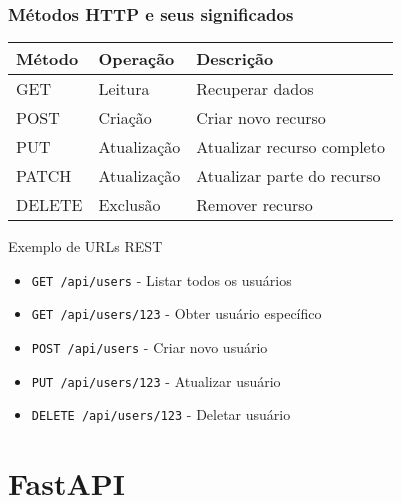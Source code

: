 \documentclass[aspectratio=169]{beamer}
\begin{document}
\begin{frame}
    \frametitle{Métodos HTTP e seus significados}
    \begin{center}
        \begin{tabular}{|l|l|l|}
            \hline
            \textbf{Método} & \textbf{Operação} & \textbf{Descrição} \\
            \hline
            GET & Leitura & Recuperar dados \\
            \hline
            POST & Criação & Criar novo recurso \\
            \hline
            PUT & Atualização & Atualizar recurso completo \\
            \hline
            PATCH & Atualização & Atualizar parte do recurso \\
            \hline
            DELETE & Exclusão & Remover recurso \\
            \hline
        \end{tabular}
    \end{center}
    
    \vspace{1em}
    \begin{exampleblock}{Exemplo de URLs REST}
        \begin{itemize}
            \item \texttt{GET /api/users} - Listar todos os usuários
            \item \texttt{GET /api/users/123} - Obter usuário específico
            \item \texttt{POST /api/users} - Criar novo usuário
            \item \texttt{PUT /api/users/123} - Atualizar usuário
            \item \texttt{DELETE /api/users/123} - Deletar usuário
        \end{itemize}
    \end{exampleblock}
\end{frame}

\section{FastAPI}
\end{document}
